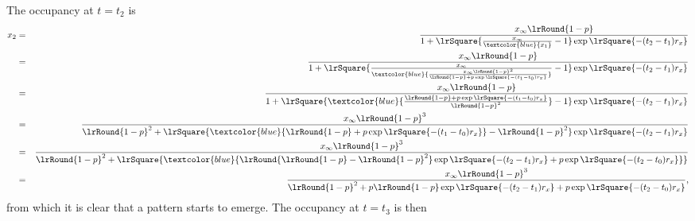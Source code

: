 \documentclass[11pt,landscape]{article}
\begin{document}
The occupancy at $t=t_2$ is
\begin{eqnarray}
x_2 
&=& \frac{x_{\infty} \lrRound{1-p}}
{1 + \lrSquare{ \frac{x_{\infty}}{\textcolor{blue}{x_1}} -1}
\exp\lrSquare{- (t_2-t_1) r_x }}
\nonumber
\label{t2Occup0}
\\
&=& \frac{x_{\infty} \lrRound{1-p}}
{1 + \lrSquare{ \frac{x_{\infty}}
    {\textcolor{blue}{
        \frac{ x_{\infty} \lrRound{1-p}^2}
        { \lrRound{1-p} + p \exp\lrSquare{- (t_1-t_0) r_x }}
      }} -1}
\exp\lrSquare{- (t_2-t_1) r_x }}
\nonumber
\label{t2Occup1}
\\
&=& \frac{x_{\infty} \lrRound{1-p}}
{1 + \lrSquare{ 
    \textcolor{blue}{
      \frac
      { \lrRound{1-p} + p \exp\lrSquare{- (t_1-t_0) r_x }}
      { \lrRound{1-p}^2}
    } 
    -1
  }
  \exp\lrSquare{- (t_2-t_1) r_x }}
\nonumber
\label{t2Occup2}
\\
&=& \frac{x_{\infty} \lrRound{1-p}^3}
{\lrRound{1-p}^2 + \lrSquare{ 
    \textcolor{blue}{
      { \lrRound{1-p} 
        + p \exp\lrSquare{- (t_1-t_0) r_x }}
    } 
    - \lrRound{1-p}^2
  }
  \exp\lrSquare{- (t_2-t_1) r_x }
}
\nonumber
\label{t2Occup3}
\\
&=& \frac{x_{\infty} \lrRound{1-p}^3}
{
  \lrRound{1-p}^2 + \lrSquare{ 
    \textcolor{blue}{  
      \lrRound{ \lrRound{1-p}     - \lrRound{1-p}^2}
      \exp\lrSquare{- (t_2-t_1) r_x }
      + p \exp\lrSquare{- (t_2-t_0) r_x }}
  } 
}
\nonumber
\label{t2Occup4}
\\
&=& \frac{x_{\infty} \lrRound{1-p}^3}
{
  \lrRound{1-p}^2 + 
  p\lrRound{1-p}
  \exp\lrSquare{- (t_2-t_1) r_x }
  + p \exp\lrSquare{- (t_2-t_0) r_x }
},
\label{t2Occup5}
\end{eqnarray}
from which it is clear that a pattern starts to emerge.
The occupancy at $t=t_3$ is then 
\end{document}
